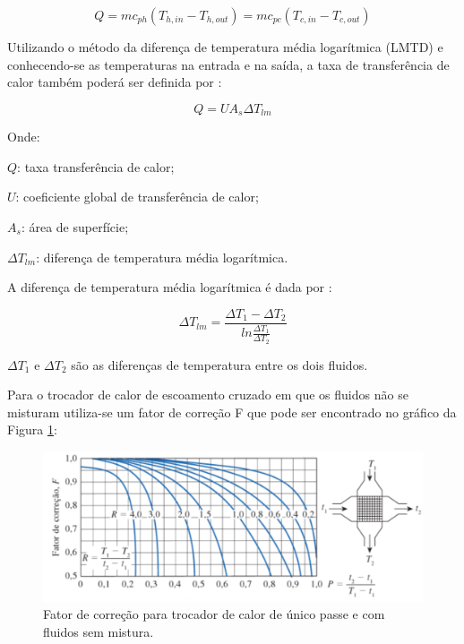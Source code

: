 \begin{equation}
	Q = mc_{ph}(T_{h, in} - T_{h, out}) = mc_{pc}(T_{c, in} - T_{c, out})
\end{equation}

Utilizando o método da diferença de temperatura média logarítmica (LMTD) e conhecendo-se as temperaturas na entrada e na saída, a taxa de transferência de calor também poderá ser definida por \cite{energiaTransferencia}:

\begin{equation}
	Q = UA_{s}\Delta T_{lm}
\end{equation}

Onde:

$Q$: taxa transferência de calor;

$U$: coeficiente global de transferência de calor;

$A_{s}$: área de superfície;

$\Delta T_{lm}$: diferença de temperatura média logarítmica.

A diferença de temperatura média logarítmica é dada por :

\begin{equation}
	\Delta T_{lm} = \frac{\Delta T_{1}-\Delta T_{2}}{ln \frac{\Delta T_{1}}{\Delta T_{2}}}
\end{equation}

$\Delta T_{1}$ e $\Delta T_{2}$ são as diferenças de temperatura entre os dois fluidos.

Para o trocador de calor de escoamento cruzado em que os fluidos não se misturam utiliza-se um fator de correção F que pode ser encontrado no gráfico da Figura \ref{fator-de-correcao}:

\begin{figure}[h!]
	\centering
	\includegraphics[keepaspectratio=true,scale= 0.3]{figuras/fator-de-correcao.png}
	\caption{Fator de correção para trocador de calor de único passe e com fluidos sem mistura.\cite{energiaTransferencia}}
	\label{fator-de-correcao}
\end{figure}

